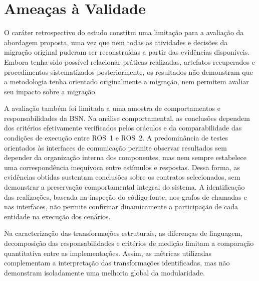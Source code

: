 \section{Ameaças à Validade}

O caráter retrospectivo do estudo constitui uma limitação para a avaliação da abordagem proposta, uma vez que nem todas as atividades e decisões da migração original puderam ser reconstruídas a partir das evidências disponíveis. Embora tenha sido possível relacionar práticas realizadas, artefatos recuperados e procedimentos sistematizados posteriormente, os resultados não demonstram que a metodologia tenha orientado originalmente a migração, nem permitem avaliar seu impacto sobre a migração.

A avaliação também foi limitada a uma amostra de comportamentos e responsabilidades da BSN. Na análise comportamental, as conclusões dependem dos critérios efetivamente verificados pelos oráculos e da comparabilidade das condições de execução entre ROS~1 e ROS~2. A predominância de testes orientados às interfaces de comunicação permite observar resultados sem depender da organização interna dos componentes, mas nem sempre estabelece uma correspondência inequívoca entre estímulos e respostas. Dessa forma, as evidências obtidas sustentam conclusões sobre os contratos selecionados, sem demonstrar a preservação comportamental integral do sistema. A identificação das realizações, baseada na inspeção do código-fonte, nos grafos de chamadas e nas interfaces, não permite confirmar dinamicamente a participação de cada entidade na execução dos cenários.

Na caracterização das transformações estruturais, as diferenças de linguagem, decomposição das responsabilidades e critérios de medição limitam a comparação quantitativa entre as implementações. Assim, as métricas utilizadas complementam a interpretação das transformações identificadas, mas não demonstram isoladamente uma melhoria global da modularidade. %

